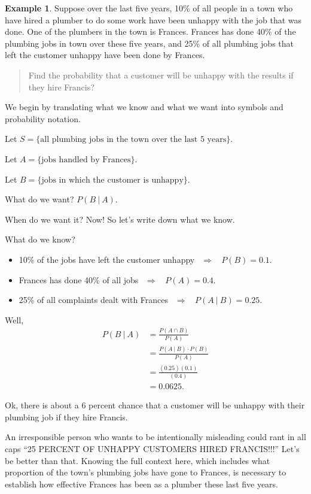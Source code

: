 \documentclass[
]{book}
\providecommand{\tightlist}{%
  \setlength{\itemsep}{0pt}\setlength{\parskip}{0pt}}
\theoremstyle{definition}
\theoremstyle{definition}
\newtheorem{example}{Example}[chapter]
\theoremstyle{definition}
\theoremstyle{definition}
\theoremstyle{remark}
\begin{document}
\begin{example}
\protect\hypertarget{exm:plumbing}{}\label{exm:plumbing}Suppose over the last five years, 10\% of all people in a town who have hired a plumber to do some work have been unhappy with the job that was done. One of the plumbers in the town is Frances. Frances has done 40\% of the plumbing jobs in town over these five years, and 25\% of all plumbing jobs that left the customer unhappy have been done by Frances.

\begin{quote}
Find the probability that a customer will be unhappy with the results if they hire Francis?
\end{quote}

We begin by translating what we know and what we want into symbols and probability notation.

Let \(S = \{ \text{all plumbing jobs in the town over the last 5 years} \}.\)

Let \(A = \{ \text{jobs handled by Frances} \}.\)

Let \(B = \{ \text{jobs in which the customer is unhappy} \}.\)

What do we want? \(P(B~|~A).\)

When do we want it? Now! So let's write down what we know.

What do we know?

\begin{itemize}
\tightlist
\item
  10\% of the jobs have left the customer unhappy \(~~\Rightarrow~~~~ P(B) = 0.1\).
\item
  Frances has done 40\% of all jobs \(~~\Rightarrow~~~~ P(A) = 0.4\).
\item
  25\% of all complaints dealt with Frances \(~~\Rightarrow~~~~ P(A~|~B) = 0.25\).
\end{itemize}

Well,
\begin{align*}
P(B~|~A) &= \frac{P(A\cap B)}{P(A)} \\
         &= \frac{P(A ~|~B)\cdot P(B)}{P(A)} \\
         &= \frac{(0.25)(0.1)}{(0.4)} \\
         &= 0.0625.
\end{align*}

Ok, there is about a 6 percent chance that a customer will be unhappy with their plumbing job if they hire Francis.

An irresponsible person who wants to be intentionally misleading could rant in all caps ``25 PERCENT OF UNHAPPY CUSTOMERS HIRED FRANCIS!!!'' Let's be better than that. Knowing the full context here, which includes what proportion of the town's plumbing jobs have gone to Frances, is necessary to establish how effective Frances has been as a plumber these last five years.
\end{example}
\end{document}
